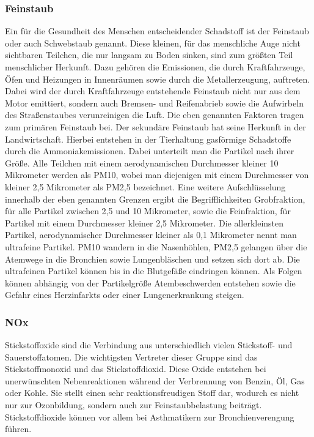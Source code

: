 \subsubsection{Feinstaub}
Ein für die Gesundheit des Menschen entscheidender Schadstoff ist der Feinstaub oder auch Schwebstaub genannt. Diese kleinen, für das menschliche Auge nicht sichtbaren Teilchen, die nur langsam zu Boden sinken, sind zum größten Teil menschlicher Herkunft. Dazu gehören die Emissionen, die durch Kraftfahrzeuge, Öfen und Heizungen in Innenräumen sowie durch die Metallerzeugung, auftreten. Dabei wird der durch Kraftfahrzeuge entstehende Feinstaub nicht nur aus dem Motor emittiert, sondern auch Bremsen- und Reifenabrieb sowie die Aufwirbeln des Straßenstaubes verunreinigen die Luft. Die eben genannten Faktoren tragen zum primären Feinstaub bei. Der sekundäre Feinstaub hat seine Herkunft in der Landwirtschaft. Hierbei entstehen in der Tierhaltung gasförmige Schadstoffe durch die Ammoniakemissionen. 
\newline
Dabei unterteilt man die Partikel nach ihrer Größe. Alle Teilchen mit einem aerodynamischen Durchmesser kleiner 10 Mikrometer werden als PM10, wobei man diejenigen mit einem Durchmesser von kleiner 2,5 Mikrometer als PM2,5 bezeichnet. Eine weitere Aufschlüsselung innerhalb der eben genannten Grenzen ergibt die Begrifflichkeiten Grobfraktion, für alle Partikel zwischen 2,5 und 10 Mikrometer, sowie die Feinfraktion, für Partikel mit einem Durchmesser kleiner 2,5 Mikrometer. Die allerkleinsten Partikel, aerodynamischer Durchmesser kleiner als 0,1 Mikrometer nennt man ultrafeine Partikel. PM10 wandern in die Nasenhöhlen, PM2,5 gelangen über die Atemwege in die Bronchien sowie Lungenbläschen und setzen sich dort ab. Die ultrafeinen Partikel können bis in die Blutgefäße eindringen können. Als Folgen können abhängig von der Partikelgröße Atembeschwerden entstehen sowie die Gefahr eines Herzinfarkts oder einer Lungenerkrankung steigen. 

\subsubsection{\acs{NOx}}
Stickstoffoxide sind die Verbindung aus unterschiedlich vielen Stickstoff- und Sauerstoffatomen. Die wichtigsten Vertreter dieser Gruppe sind das Stickstoffmonoxid und das Stickstoffdioxid. Diese Oxide entstehen bei unerwünschten Nebenreaktionen während der Verbrennung von Benzin, Öl, Gas oder Kohle. Sie stellt einen sehr reaktionsfreudigen Stoff dar, wodurch es nicht nur zur Ozonbildung, sondern auch zur Feinstaubbelastung beiträgt. 
\newline
Stickstoffdioxide können vor allem bei Asthmatikern zur Bronchienverengung führen. 

